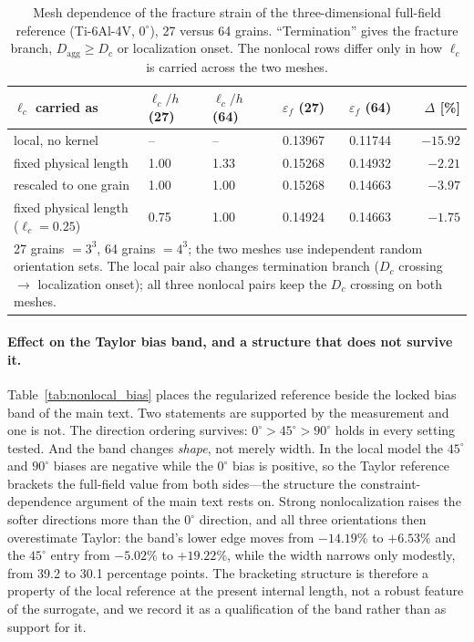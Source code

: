 \documentclass[11pt,a4paper,twocolumn]{article}
\providecommand{\ang}[1]{\ensuremath{#1^{\circ}}}
\begin{document}
\begin{table}[htbp]
\centering
\caption{Mesh dependence of the fracture strain of the three-dimensional full-field reference (Ti-6Al-4V,
$\ang{0}$), 27 versus 64 grains. ``Termination'' gives the fracture branch, $D_{\mathrm{agg}} \ge D_c$ or
localization onset. The nonlocal rows differ only in how $\ell_c$ is carried across the two meshes.}
\label{tab:nonlocal_mesh}
\footnotesize
\setlength{\tabcolsep}{3pt}
\begin{tabular}{p{}p{}p{}ccr}
\toprule
$\ell_c$ carried as & $\ell_c/h$ (27) & $\ell_c/h$ (64) & $\varepsilon_f$ (27) & $\varepsilon_f$ (64) & $\Delta$ [\%] \\
\midrule
local, no kernel & -- & -- & 0.13967 & 0.11744 & $-15.92$ \\
fixed physical length & 1.00 & 1.33 & 0.15268 & 0.14932 & $-2.21$ \\
rescaled to one grain & 1.00 & 1.00 & 0.15268 & 0.14663 & $-3.97$ \\
fixed physical length ($\ell_c = 0.25$) & 0.75 & 1.00 & 0.14924 & 0.14663 & $-1.75$ \\
\bottomrule
\multicolumn{6}{p{0.97\columnwidth}}{\footnotesize 27 grains $= 3^3$, 64 grains $= 4^3$; the two meshes use
independent random orientation sets. The local pair also changes termination branch ($D_c$ crossing $\to$
localization onset); all three nonlocal pairs keep the $D_c$ crossing on both meshes.}
\end{tabular}
\end{table}

\paragraph{Effect on the Taylor bias band, and a structure that does not survive it.} Table~\ref{tab:nonlocal_bias}
places the regularized reference beside the locked bias band of the main text. Two statements are supported by
the measurement and one is not. The direction ordering survives: $\ang{0} > \ang{45} > \ang{90}$ holds in every
setting tested. And the band changes \emph{shape}, not merely width. In the local model the $\ang{45}$ and
$\ang{90}$ biases are negative while the $\ang{0}$ bias is positive, so the Taylor reference brackets the
full-field value from both sides---the structure the constraint-dependence argument of the main text rests on.
Strong nonlocalization raises the softer directions more than the $\ang{0}$ direction, and all three
orientations then overestimate Taylor: the band's lower edge moves from $-14.19\%$ to $+6.53\%$ and the
$\ang{45}$ entry from $-5.02\%$ to $+19.22\%$, while the width narrows only modestly, from 39.2 to 30.1
percentage points. The bracketing structure is therefore a property of the local reference at the present
internal length, not a robust feature of the surrogate, and we record it as a qualification of the band rather
than as support for it.
\end{document}
